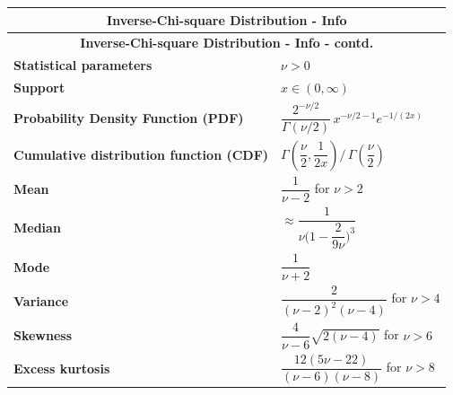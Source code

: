 \renewcommand{\arraystretch}{2}
\begin{longtable}{|m{6cm}|p{9cm}|}
    \hline
    \multicolumn{2}{|c|}{\textbf{Inverse-Chi-square Distribution - Info} \cite{wiki/Inverse-chi-squared_distribution}} \\
    \hline\endfirsthead

    \hline
    \multicolumn{2}{|c|}{\textbf{Inverse-Chi-square Distribution - Info - contd.} \cite{wiki/Inverse-chi-squared_distribution}} \\
    \hline\endhead
    
    \hline\endfoot
    \hline\endlastfoot

    \textbf{Statistical parameters} & 
    ${\displaystyle \nu >0\!}$
    \\ \hline
    
    \textbf{Support} &
    ${\displaystyle x\in (0,\infty )\!}$
    \\ \hline

    \textbf{Probability Density Function (PDF)} & 
    ${\displaystyle {\dfrac {2^{-\nu /2}}{\Gamma (\nu /2)}}\,x^{-\nu /2-1}e^{-1/(2x)}\!}$
    \\[1ex] \hline
    
    \textbf{Cumulative distribution function (CDF)} & 
    ${\displaystyle \Gamma \!\left({\dfrac {\nu }{2}},{\dfrac {1}{2x}}\right){\bigg /}\,\Gamma \!\left({\dfrac {\nu }{2}}\right)\!}$
    \\ \hline

    \textbf{Mean} & 
    ${\displaystyle {\dfrac {1}{\nu -2}}\!}$ for ${\displaystyle \nu >2\!}$
    \\[1ex] \hline

    \textbf{Median} & 
    ${\displaystyle \approx {\dfrac {1}{\nu {\bigg (}1-{\dfrac {2}{9\nu }}{\bigg )}^{3}}}}$
    \\[1ex] \hline

    \textbf{Mode} & 
    ${\displaystyle {\dfrac {1}{\nu +2}}\!}$
    \\ \hline

    \textbf{Variance} &
    ${\displaystyle {\dfrac {2}{(\nu -2)^{2}(\nu -4)}}\!}$ for ${\displaystyle \nu >4\!}$
    \\[1ex] \hline

    \textbf{Skewness} &
    ${\displaystyle {\dfrac {4}{\nu -6}}{\sqrt {2(\nu -4)}}\!}$ for ${\displaystyle \nu >6\!}$
    \\[1ex] \hline

    \textbf{Excess kurtosis} &
    ${\displaystyle {\dfrac {12(5\nu -22)}{(\nu -6)(\nu -8)}}\!}$ for ${\displaystyle \nu >8\!}$
    \\[1ex] \hline


\end{longtable}
